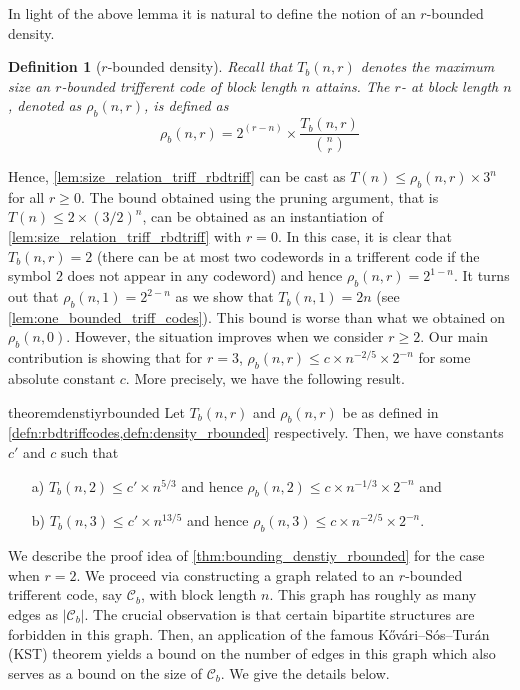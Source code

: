 \documentclass[10pt,a4paper]{article}
\newcommand{\rbdtrifferentcodes}{$r$-bounded trifferent code}
\newcommand{\densityrbd}{$r$-bounded density}
\newcommand{\calC}{\mathcal{C}}
\newcommand{\define}[1]{\textsb{#1}}
\newtheorem{definition}{Definition}[section]
\DeclareMathOperator{\1}{\mathbf{1}}
\begin{document}
In light of the above lemma it is natural to define the notion of an $r$-bounded density.

\begin{definition}[\densityrbd{}]
\label{defn:density_rbounded}
	Recall that $T_b(n,r)$ denotes the maximum size an \rbdtrifferentcodes{} of block length $n$ attains.
	The $r$-\define{bounded density} at block length $n$, denoted as $\rho_b(n,r)$, is defined as $$\rho_b(n, r) = 2^{(r-n)} \times \frac{T_b(n,r)}{\binom{n}{r}}$$
\end{definition}

Hence, \cref{lem:size_relation_triff_rbdtriff} can be cast as $T(n)\leq \rho_b(n,r) \times 3^n$ for all $r\geq 0$.
The bound obtained using the pruning argument, that is $T(n)\leq 2\times (3/2)^n$, can be obtained as an instantiation of \cref{lem:size_relation_triff_rbdtriff} with $r=0$.
In this case, it is clear that $T_b(n,r)=2$ (there can be at most two codewords in a trifferent code if the symbol $2$ does not appear in any codeword) and hence $\rho_b(n,r)=2^{1-n}$. It turns out that $\rho_b(n,1) = 2^{2-n}$ as we show that $T_b(n,1)=2n$ (see \cref{lem:one_bounded_triff_codes}).
This bound is worse than what we obtained on $\rho_b(n,0)$. However, the situation improves when we consider $r\geq 2$. 
Our main contribution is showing that for $r = 3$, $\rho_b(n,r)\leq c\times n^{-2/5}\times 2^{-n}$ for some absolute constant $c$.
More precisely, we have the following result.

\begin{restatable}[Bounding \densityrbd{}]{theorem}{denstiyrbounded}
	\label{thm:bounding_denstiy_rbounded}
	Let $T_b(n,r)$ and $\rho_b(n,r)$ be as defined in \cref{defn:rbdtriffcodes,defn:density_rbounded} respectively. Then, we have constants $c'$ and $c$ such that  
	\begin{enumerate}
		\item[a)] $T_b(n,2)\leq c'\times n^{5/3}$ and hence $\rho_b(n,2)\leq c\times n^{-1/3}\times 2^{-n}$ and
		\item[b)] $T_b(n,3)\leq c'\times n^{13/5}$  and hence $\rho_b(n,3)\leq c\times n^{-2/5}\times 2^{-n}$.
\end{enumerate}
\end{restatable}



We describe the proof idea of \cref{thm:bounding_denstiy_rbounded} for the case when $r=2$.
We proceed via constructing a graph related to an \rbdtrifferentcodes{}, say $\calC_b$, with block length $n$.
This graph has roughly as many edges as $|\calC_b|$.
The crucial observation is that certain bipartite structures are forbidden in this graph. Then, an application of the famous K\H{o}v\'{a}ri--S\'{o}s--Tur\'{a}n (KST) theorem yields a bound on the number of edges in this graph which also serves as a bound on the size of $\calC_b$.
We give the details below.
\end{document}
